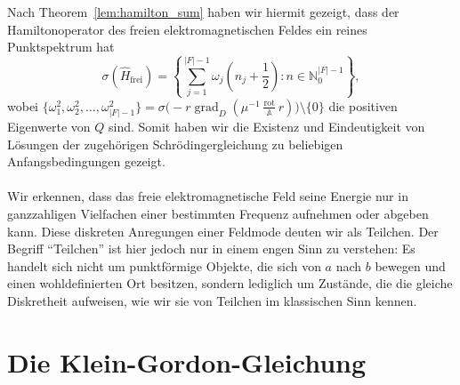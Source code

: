 \documentclass[11pt,a4paper,leqno]{report}
\numberwithin{equation}{chapter}
\begin{document}
\noindent
Nach Theorem~\ref{lem:hamilton_sum} haben wir hiermit gezeigt, dass der Hamiltonoperator des freien elektromagnetischen Feldes ein reines Punktspektrum hat
\begin{equation}
	\sigma(\hat{H}_{\mathrm{frei}}) = \left\{\sum_{j=1}^{|F|-1} \omega_j\left(n_j + \frac{1}{2}\right) : n \in \mathbb{N}_0^{|F|-1}\right\},
\end{equation}
wobei \(\{\omega_1^2, \omega_2^2, \dots, \omega_{|F|-1}^2\} = \sigma\bigl(-r\operatorname{grad}_D(\mu^{-1}\frac{\operatorname{rot}}{\mathbb{A}}r)\bigr) \setminus \{0\}\) 
die positiven Eigenwerte von \(Q\) sind. Somit haben wir die Existenz und Eindeutigkeit 
von Lösungen der zugehörigen Schrödingergleichung zu beliebigen Anfangsbedingungen gezeigt.
\\
\\
Wir erkennen, dass das freie elektromagnetische Feld seine Energie nur in 
ganzzahligen Vielfachen einer bestimmten Frequenz aufnehmen oder abgeben kann. 
Diese diskreten Anregungen einer Feldmode deuten wir als Teilchen. 
Der Begriff ``Teilchen'' ist hier jedoch nur in einem engen Sinn zu verstehen: 
Es handelt sich nicht um punktförmige Objekte, die sich von $a$ nach $b$ 
bewegen und einen wohldefinierten Ort besitzen, sondern lediglich um Zustände, 
die die gleiche Diskretheit aufweisen, wie wir sie von Teilchen im klassischen Sinn kennen.

\chapter{Die Klein-Gordon-Gleichung}
\end{document}
